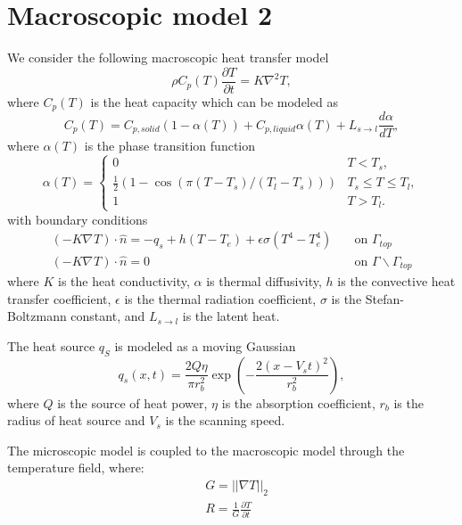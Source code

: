 \documentclass[a4paper,12pt]{article}
\newcommand{\grad}[1]{\nabla_{#1}}
\begin{document}
\section{Macroscopic model 2}
We consider the following macroscopic heat transfer model
\begin{equation}
\rho C_p(T) \frac{\partial T}{\partial t} = K \grad{}^2 T,
\end{equation}
where $C_p(T)$ is the heat capacity which can be modeled as
\begin{equation}
C_p(T) = C_{p,solid} ( 1-\alpha(T)) + C_{p,liquid} \alpha(T) + L_{s\rightarrow l} \frac{d \alpha}{ dT},
\end{equation}
where $\alpha(T)$ is the phase transition function
\begin{equation}
\alpha(T) = 
\left\{
\begin{array}{lr}
0 & T < T_s, \\
\frac{1}{2}( 1 - \cos(\pi (T-T_s)/ (T_l-T_s))) & T_s \leq T \leq T_l, \\
1 &  T > T_l.
\end{array}
\right.
\end{equation}
with boundary conditions 
\begin{align}
(-K \grad{} T) \cdot \hat{n} = -q_s + h(T - T_e) + \epsilon \sigma (T^4 - T_e^4)  & \quad \text{on } \Gamma_{top} \\
(-K \grad{} T) \cdot \hat{n} = 0  & \quad \text{on } \Gamma  \backslash \Gamma_{top}
\end{align}
where $K$ is the heat conductivity, $\alpha$ is thermal diffusivity, $h$ is the convective heat transfer coefficient, $\epsilon$ is the thermal radiation coefficient, $\sigma$ is the Stefan-Boltzmann constant, and $L_{s\rightarrow l}$ is the latent heat. 

The heat source $q_S$ is modeled as a moving Gaussian
\begin{equation}
q_s(x, t ) = \frac{2Q\eta}{\pi r_b^2} \exp \left( -\frac{ 2(x-V_s t)^2}{ r_b^2} \right),
\end{equation}
where $Q$ is the source of heat power, $\eta$ is the absorption coefficient, $r_b$ is the radius of heat source and $V_s$ is the scanning speed.  

The microscopic model  is coupled to the macroscopic model through the temperature field, where:
\begin{align}
    &G = ||\nabla {T}||_2 \\
    &R = \frac{1}{G}\frac{\partial {T}}{\partial t}
\end{align}
\end{document}
